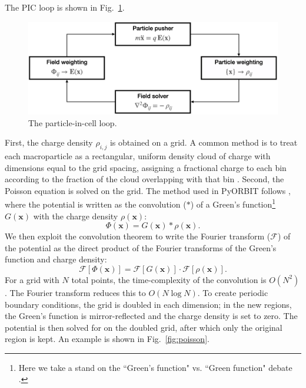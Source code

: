 The PIC loop is shown in Fig.~\ref{fig:pic_loop}. 
%
\begin{figure}[!p]
    \centering
    \includegraphics[width=\textwidth]{Images/chapter3/pic_loop.png}
    \caption{\label{fig:pic_loop}The particle-in-cell loop.}
\end{figure}
%
First, the charge density $\rho_{i,j}$ is obtained on a grid. A common method is to treat each macroparticle as a rectangular, uniform density cloud of charge with dimensions equal to the grid spacing, assigning a fractional charge to each bin according to the fraction of the cloud overlapping with that bin \cite{Birdsall1975}. Second, the Poisson equation is solved on the grid. The method used in PyORBIT follows \cite{Hockney1981}, where the potential is written as the convolution ($*$) of a Green's function\footnote{Here we take a stand on the ``Green's function" vs. ``Green function" debate \cite{Wright2006}.} $G(\mathbf{x})$ with the charge density $\rho(\mathbf{x})$:
%
\begin{equation}
    \Phi(\mathbf{x}) = G(\mathbf{x}) * \rho(\mathbf{x}).
\end{equation}
%
We then exploit the convolution theorem \cite{Arfken1985} to write the Fourier transform ($\mathcal{F}$) of the potential as the direct product of the Fourier transforms of the Green's function and charge density:
%
\begin{equation}
    \mathcal{F}[\Phi(\mathbf{x})]
    =
    \mathcal{F}[G(\mathbf{x})] \cdot \mathcal{F}[\rho(\mathbf{x})].
\end{equation}
%
For a grid with $N$ total points, the time-complexity of the convolution is $O(N^2)$. The Fourier transform reduces this to $O(N \log N)$. To create periodic boundary conditions, the grid is doubled in each dimension; in the new regions, the Green's function is mirror-reflected and the charge density is set to zero. The potential is then solved for on the doubled grid, after which only the original region is kept. An example is shown in Fig.~\ref{fig:poisson}. 
%
